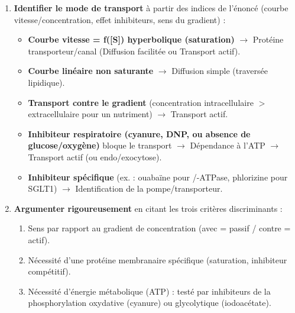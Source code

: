 \documentclass[11pt]{article}
\begin{document}
\begin{methode}
\begin{enumerate}
\item \textbf{Identifier le mode de transport} à partir des indices de l'énoncé (courbe vitesse/concentration, effet inhibiteurs, sens du gradient) :
\begin{itemize}
\item \textbf{Courbe vitesse = f([S]) hyperbolique (saturation)} $\to$ Protéine transporteur/canal (Diffusion facilitée ou Transport actif).
\item \textbf{Courbe linéaire non saturante} $\to$ Diffusion simple (traversée lipidique).
\item \textbf{Transport contre le gradient} (concentration intracellulaire $>$ extracellulaire pour un nutriment) $\to$ Transport actif.
\item \textbf{Inhibiteur respiratoire (cyanure, DNP, ou absence de glucose/oxygène)} bloque le transport $\to$ Dépendance à l'ATP $\to$ Transport actif (ou endo/exocytose).
\item \textbf{Inhibiteur spécifique} (ex. : ouabaïne pour /-ATPase, phlorizine pour SGLT1) $\to$ Identification de la pompe/transporteur.
\end{itemize}
\item \textbf{Argumenter rigoureusement} en citant les trois critères discriminants :
\begin{enumerate}
\item Sens par rapport au gradient de concentration (avec = passif / contre = actif).
\item Nécessité d'une protéine membranaire spécifique (saturation, inhibiteur compétitif).
\item Nécessité d'énergie métabolique (ATP) : testé par inhibiteurs de la phosphorylation oxydative (cyanure) ou glycolytique (iodoacétate).
\end{enumerate}
\end{enumerate}
\end{methode}
\end{document}
